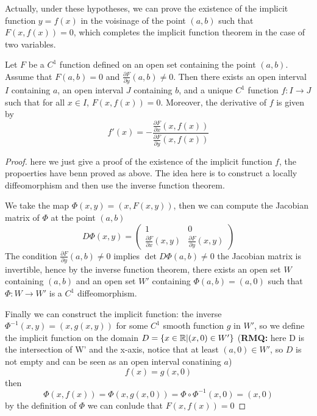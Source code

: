 Actually, under these hypotheses, we can prove the existence of the implicit function \(y= f(x)\) in the voisinage of the point \((a,b)\) such that \(F(x,f(x))=0\), which completes the implicit function theorem in the case of two variables.\\

\begin{theorem}
Let \(F\) be a \(C^1\) function defined on an open set containing the point \((a,b)\). Assume that \(F(a,b) = 0\) and \(\frac{\partial F}{\partial y}(a,b) \neq 0\). Then there exists an open interval \(I\) containing \(a\), an open interval \(J\) containing \(b\), and a unique \(C^1\) function \(f: I \to J\) such that for all \(x \in I\), \(F(x, f(x)) = 0\). Moreover, the derivative of \(f\) is given by
\[f'(x) = -\frac{\frac{\partial F}{\partial x}(x,f(x))}{\frac{\partial F}{\partial y}(x,f(x))}\]
\end{theorem}

\begin{proof}
    here we just give a proof of the existence of the implicit function \(f\), the propoerties have benn proved as above. The idea here is to construct a locally diffeomorphism and then use the inverse function theorem.

    We take the map \(\Phi(x,y) = (x, F(x,y))\), then we can compute the Jacobian matrix of \(\Phi\) at the point \((a,b)\)
    \[D\Phi(x,y) = \begin{pmatrix}
        1 & 0 \\
        \frac{\partial F}{\partial x}(x,y) & \frac{\partial F}{\partial y}(x,y) 
\end{pmatrix}\]
The condition \(\frac{\partial F}{\partial y}(a,b) \neq 0\) implies \(\det D\Phi(a,b) \neq 0\) the Jacobian matrix is invertible, hence by the inverse function theorem, there exists an open set \(W\) containing \((a,b)\) and an open set \(W'\) containing \(\Phi(a,b) = (a,0)\) such that \(\Phi: W \to W'\) is a \(C^1\) diffeomorphism.

Finally we can construct the implicit function: the inverse \(\Phi^{-1}(x,y) = (x, g(x,y))\) for some \(C^1\) smooth function \(g\) in \(W'\), so we define the implicit function on the domain \(D = \{x \in \mathbb{R} | (x,0) \in W'\}\) (\textbf{RMQ:} here D is the intersection of W' and the x-axis, notice that at least \((a,0) \in W'\), so \(D\) is not empty and can be seen as an open interval conatining \(a\))
\[f(x) = g(x,0)\]
then 
\[\Phi(x,f(x)) = \Phi(x,g(x,0)) = \Phi \circ \Phi^{-1}(x,0) = (x,0)\]
by the definition of \(\Phi\) we can conlude that \(F(x,f(x)) = 0\)
\end{proof}

